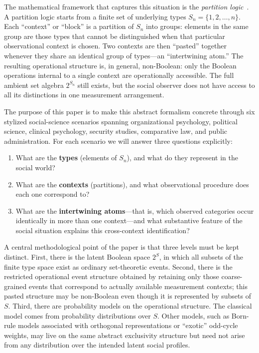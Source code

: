\documentclass{article}
\begin{document}
The mathematical framework that captures this situation is the
\emph{partition logic}~\cite{svozil-93,schaller-92,
dvur-pul-svo,svozil-2001-eua}. A partition logic starts from a
finite set of underlying types $S_n = \{1,2,\ldots,n\}$.
Each ``context'' or ``block'' is a partition of $S_n$ into groups:
elements in the same group are those types that cannot be
distinguished when that particular observational context is chosen.
Two contexts are then ``pasted'' together whenever they share an
identical group of types---an ``intertwining atom.'' The resulting
operational structure is, in general, non-Boolean: only the
Boolean operations internal to a single context are operationally
accessible. The full ambient set algebra $2^{S_n}$ still exists, but
the social observer does not have access to all its distinctions in
one measurement arrangement.

The purpose of this paper is to make this abstract formalism concrete
through six stylized social-science scenarios spanning organizational
psychology, political science, clinical psychology, security studies,
comparative law, and public administration. For each scenario we will
answer three questions explicitly:
\begin{enumerate}
\item What are the \textbf{types} (elements of $S_n$), and
what do they represent in the social world?
\item What are the \textbf{contexts} (partitions), and what
observational procedure does each one correspond to?
\item What are the \textbf{intertwining atoms}---that is, which
observed categories occur identically in more than one context---and
what substantive feature of the social situation explains this
cross-context identification?
\end{enumerate}

A central methodological point of the paper is that three levels
must be kept distinct. First, there is the latent Boolean space
$2^S$, in which all subsets of the finite type space exist as
ordinary set-theoretic events. Second, there is the restricted
operational event structure obtained by retaining only those
coarse-grained events that correspond to actually available
measurement contexts; this pasted structure may be non-Boolean even
though it is represented by subsets of $S$. Third, there are
probability models on the operational structure. The classical model
comes from probability distributions over $S$. Other models, such as
Born-rule models associated with orthogonal representations or
``exotic'' odd-cycle weights, may live on the same abstract
exclusivity structure but need not arise from any distribution over
the intended latent social profiles.
\end{document}
